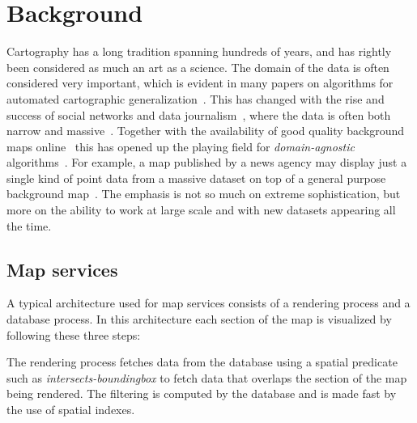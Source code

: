 \section{Background}
\label{sec:background}



Cartography has a long tradition spanning hundreds of years, and has rightly been considered as much an art as a science. The domain of the data is often considered very important, which is evident in many papers on algorithms for automated cartographic generalization~\cite{areaagg,ordnance,another}. This has changed with the rise and success of social networks and data journalism~\cite{datajournalism}, where the data is often both narrow and massive~\cite{twitter,datablog}. Together with the availability of good quality background maps online~\cite{bing,google,osm} this has opened up the playing field for \emph{domain-agnostic} algorithms~\cite{fusiontables,samet}. For example, a map published by a news agency may display just a single kind of point data from a massive dataset on top of a general purpose background map~\cite{iraq}. The emphasis is not so much on extreme sophistication, but more on the ability to work at large scale and with new datasets appearing all the time.

\subsection{Map services}

A typical architecture used for map services consists of a rendering process and a database process. In this architecture each section of the map is visualized by following these three steps:

 The rendering process fetches data from the database using a spatial predicate such as \emph{intersects-boundingbox} to fetch data that overlaps the section of the map being rendered. The filtering is computed by the database and is made fast by the use of spatial indexes.

